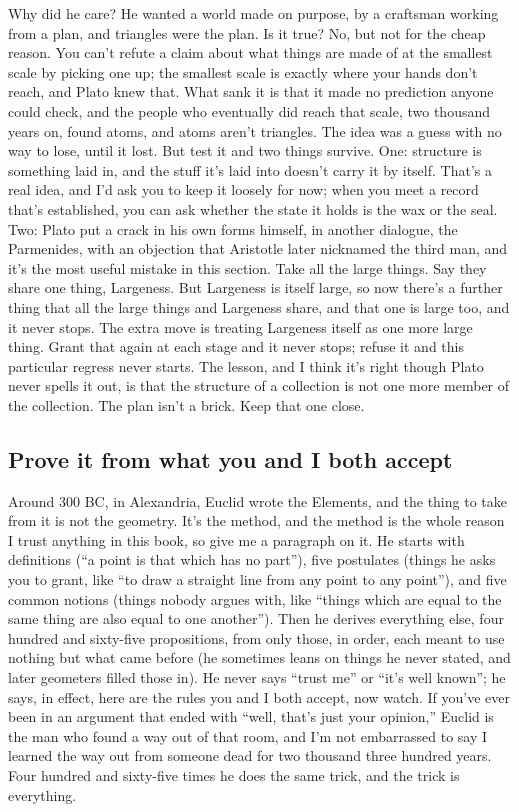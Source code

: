 \documentclass[11pt,twoside]{article}
\theoremstyle{thielethm}
\theoremstyle{thieledef}
\theoremstyle{thieledef}
\theoremstyle{thieledef}
\theoremstyle{thielethm}
\theoremstyle{thieleobs}
\theoremstyle{thielethm}
\begin{document}
Why did he care? He wanted a world made on purpose, by a craftsman working from a plan, and triangles were the plan. Is it true? No, but not for the cheap reason. You can't refute a claim about what things are made of at the smallest scale by picking one up; the smallest scale is exactly where your hands don't reach, and Plato knew that. What sank it is that it made no prediction anyone could check, and the people who eventually did reach that scale, two thousand years on, found atoms, and atoms aren't triangles. The idea was a guess with no way to lose, until it lost. But test it and two things survive. One: structure is something laid in, and the stuff it's laid into doesn't carry it by itself. That's a real idea, and I'd ask you to keep it loosely for now; when you meet a record that's established, you can ask whether the state it holds is the wax or the seal. Two: Plato put a crack in his own forms himself, in another dialogue, the Parmenides, with an objection that Aristotle later nicknamed the third man, and it's the most useful mistake in this section. Take all the large things. Say they share one thing, Largeness. But Largeness is itself large, so now there's a further thing that all the large things and Largeness share, and that one is large too, and it never stops. The extra move is treating Largeness itself as one more large thing. Grant that again at each stage and it never stops; refuse it and this particular regress never starts. The lesson, and I think it's right though Plato never spells it out, is that the structure of a collection is not one more member of the collection. The plan isn't a brick. Keep that one close.

\subsection{Prove it from what you and I both accept}

Around 300 BC, in Alexandria, Euclid wrote the Elements, and the thing to take from it is not the geometry. It's the method, and the method is the whole reason I trust anything in this book, so give me a paragraph on it. He starts with definitions (``a point is that which has no part''), five postulates (things he asks you to grant, like ``to draw a straight line from any point to any point''), and five common notions (things nobody argues with, like ``things which are equal to the same thing are also equal to one another''). Then he derives everything else, four hundred and sixty-five propositions, from only those, in order, each meant to use nothing but what came before (he sometimes leans on things he never stated, and later geometers filled those in). He never says ``trust me'' or ``it's well known''; he says, in effect, here are the rules you and I both accept, now watch. If you've ever been in an argument that ended with ``well, that's just your opinion,'' Euclid is the man who found a way out of that room, and I'm not embarrassed to say I learned the way out from someone dead for two thousand three hundred years. Four hundred and sixty-five times he does the same trick, and the trick is everything.
\end{document}
